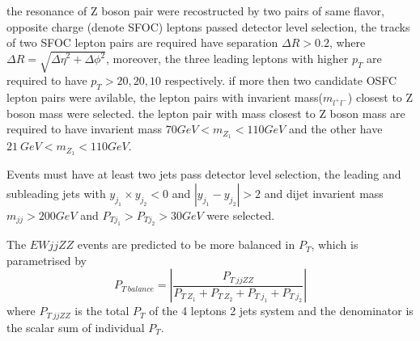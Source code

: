 \documentclass[12pt]{article}
\begin{document}
        \par the resonance of Z boson pair were recostructed by two pairs of same flavor, opposite charge (denote SFOC) leptons passed 
        detector level selection, the tracks of two SFOC lepton pairs are required have separation $\Delta R > 0.2$, 
        where $\Delta R = \sqrt{{\Delta\eta}^2 + {\Delta\phi}^2}$, moreover, the three leading leptons with higher $p_T$ are required to have 
        $p_T > 20, 20, 10$ respectively. if more then two candidate OSFC lepton pairs were avilable, the lepton pairs with invarient mass($m_{l^+l^-}$) closest 
        to Z boson mass were selected. the lepton pair with mass closest to Z boson mass are required to have invarient mass $70GeV < m_{Z_1} < 110GeV$ and the 
        other have $21\ GeV < m_{Z_1} < 110GeV$.
        \par Events must have at least two jets pass detector level selection, the leading and subleading jets with $y_{j_1} \times y_{j_2} < 0$ and $|y_{j_1} - y_{j_2}| > 2$
        and dijet invarient mass $m_{jj} > 200 GeV$ and $P_{Tj_1} > P_{Tj_2}> 30 GeV$ were selected. 
        \par The $EW jjZZ$ events are predicted to be more balanced in $P_T$, which is parametrised by 
        $$P_{T\ balance} = |\frac{P_{T\ jjZZ}}{P_{T\ Z_1} +  P_{T\ Z_2} +  P_{T\ j_1} +  P_{T\ j_2}}|$$
        where $P_{T\ jjZZ}$ is the total $P_T$ of the 4 leptons 2 jets system and the denominator is the scalar sum of individual $P_T$.
\end{document}
